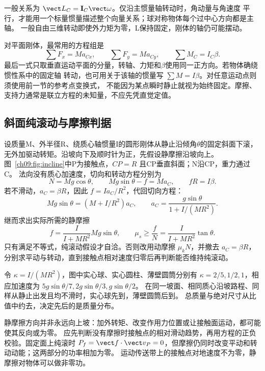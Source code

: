 一般关系为 $\vect L_C=\mathbf I_C\vect\omega$。仅沿主惯量轴转动时，角动量与角速度
平行，才能用一个标量惯量描述整个向量关系；球对称物体每个过中心方向都是主轴。
一般自由三维转动即使外力矩为零，L保持固定，刚体的轴仍可能摆动。

对平面刚体，最常用的方程组是
\begin{equation}
 \sum F_x=Ma_{Cx},\qquad \sum F_y=Ma_{Cy},\qquad \sum M_C=I_C\beta.
\end{equation}
最后一式只取垂直运动平面的分量，转轴、力矩和$\beta$使用同一正方向。若物体确绕惯性系中的固定轴
转动，也可用关于该轴的惯量写 $\sum M=I\beta$。对任意运动点则须使用前一节的参考点变换式，
不能因为某点瞬时静止就视为始终固定。摩擦、支持力通常是联立方程的未知量，不应先凭直觉定值。

\subsection{斜面纯滚动与摩擦判据}
设质量M、外半径R、绕质心轴惯量I的圆形刚体从静止沿倾角$\theta$的固定斜面下滚，
无外加驱动转矩。沿坡向下及顺时针为正，先假设静摩擦沿坡向上。
图~\ref{ch09:fig:incline}中P为接触点，$CP=R$ 且CP垂直斜面；N沿CP，重力通过C。
\inclineRollingDiagram
法向没有质心加速度，切向和转动方程分别为
\begin{equation}
 N=Mg\cos\theta,\qquad Mg\sin\theta-f=Ma_C,\qquad fR=I\beta.
\end{equation}
若不滑动，$a_C=\beta R$，因此 $f=Ia_C/R^2$，代回切向方程：
\begin{equation}
 Mg\sin\theta=(M+I/R^2)a_C,
 \qquad \boxed{a_C=\frac{g\sin\theta}{1+I/(MR^2)}}.
\end{equation}
继而求出实际所需的静摩擦
\begin{equation}
 f=\frac{I}{I+MR^2}Mg\sin\theta,\qquad
 \boxed{\mu_s\ge\frac fN=\frac{I}{I+MR^2}\tan\theta}.
\end{equation}
只有满足不等式，纯滚动假设才自洽。否则改用动摩擦 $\mu_kN$，并撤去 $a_C=\beta R$，
分别求平动与转动，直到接触点相对速度归零后再判断能否维持纯滚动。

令 $\kappa=I/(MR^2)$，图中实心球、实心圆柱、薄壁圆筒分别有
$\kappa=2/5,1/2,1$，相应加速度为 $5g\sin\theta/7,2g\sin\theta/3,g\sin\theta/2$。
在同一坡面、相同质心沿坡路程、同样从静止出发且均不滑时，实心球先到，薄壁圆筒后到。
总质量与绝对尺寸从比值中约去，决定先后的是质量分布。

静摩擦方向并非永远向上坡：加外转矩、改变作用力位置或让接触面运动，都可能使其反向或为零。
应先判断没有摩擦时接触点的相对滑动趋势，再用方程的正负校验。固定面上纯滚时
$P_f=\vect f\cdot\vect v_P=0$，但摩擦仍同时改变平动和转动动能；这两部分的功率相加为零。
运动传送带上的接触点对地速度不为零，静摩擦对物体可以做非零功。

